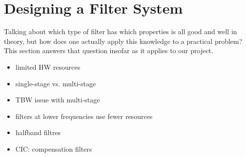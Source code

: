 \documentclass[a4paper,oneside]{alpenthesis/alpenthesis}
\begin{document}
\section{Designing a Filter System}
\label{sec:designing-a-filter-system}

Talking about which type of filter has which properties is all good and well in theory, but
how does one actually apply this knowledge to a practical problem? This section answers that
question insofar as it applies to our project.

\begin{itemize}\tightlist
    \item
        limited HW resources
    \item
        single-stage vs. multi-stage
    \item
        TBW issue with multi-stage
    \item
        filters at lower frequencies use fewer resources
    \item
        halfband filtres
    \item
        CIC: compensation filters
\end{itemize}


\end{document}
